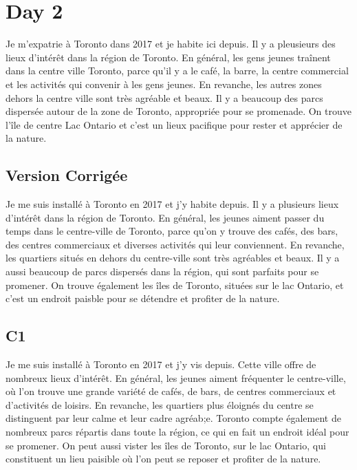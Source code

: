 \documentclass{book}
\begin{document}
\section{Day 2}
    Je m'expatrie à Toronto dans 2017 et je habite ici depuis.
    Il y a pleusieurs des lieux d'intérêt dans la région de Toronto.
    En général, les gens jeunes traînent dans la centre ville Toronto, 
    parce qu'il y a le café, la barre, la centre commercial et les activités qui convenir à les gens jeunes.
    En revanche, les autres zones dehors la centre ville sont très agréable et beaux.
    Il y a beaucoup des parcs dispersée autour de la zone de Toronto, appropriée pour se promenade.
    On trouve l'île de centre Lac Ontario et c'est un lieux pacifique pour rester et apprécier de la nature.

    \subsection{Version Corrigée}
        Je me suis installé à Toronto en 2017 et j'y habite depuis. 
        Il y a plusieurs lieux d'intérêt dans la région de Toronto.
        En général, les jeunes aiment passer du temps dans le centre-ville de Toronto, parce qu'on y trouve des cafés, des bars, des centres commerciaux et diverses activités qui leur conviennent.
        En revanche, les quartiers situés en dehors du centre-ville sont très agréables et beaux.
        Il y a aussi beaucoup de parcs dispersés dans la région, qui sont parfaits pour se promener.
        On trouve également les îles de Toronto, situées sur le lac Ontario, et c'est un endroit paisble pour se détendre et profiter de la nature.

    \subsection{C1}
        Je me suis installé à Toronto en 2017 et j'y vis depuis. 
        Cette ville offre de nombreux lieux d'intérêt.
        En général, les jeunes aiment fréquenter le centre-ville,
        où l'on trouve une grande variété de cafés, de bars, de centres commerciaux et d'activités de loisirs.
        En revanche, les quartiers plus éloignés du centre se distinguent par leur calme et leur cadre agréab;e.
        Toronto compte également de nombreux parcs répartis dans toute la région, ce qui en fait un endroit idéal pour se promener.
        On peut aussi vister les îles de Toronto, sur le lac Ontario, qui constituent un lieu paisible où l'on peut se reposer et profiter de la nature.
\end{document}
